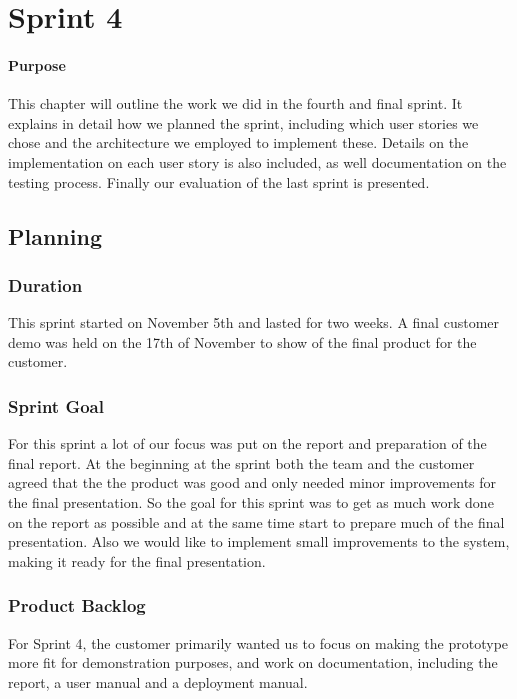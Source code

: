 \chapter{Sprint 4}

\minitoc

\subsubsection{Purpose}

This chapter will outline the work we did in the fourth and final sprint. It explains in detail how we planned the sprint, including which user stories we chose and the architecture we employed to implement these. Details on the implementation on each user story is also included, as well documentation on the testing process. Finally our evaluation of the last sprint is presented.

\clearpage


\section{Planning}

\subsection{Duration}
This sprint started on November 5th and lasted for two weeks. A final customer demo was held on the 17th of November to show of the final product for the customer.

\subsection{Sprint Goal}
For this sprint a lot of our focus was put on the report and preparation of the final report. At the beginning at the sprint both the team and the customer agreed that the the product was good and only needed minor improvements for the final presentation. So the goal for this sprint was to get as much work done on the report as possible and at the same time start to prepare much of the final presentation. Also we would like to implement small improvements to the system, making it ready for the final presentation.


\subsection{Product Backlog}
For Sprint 4, the customer primarily wanted us to focus on making the prototype more fit for demonstration purposes, and work on documentation, including the report, a user manual and a deployment manual. 

